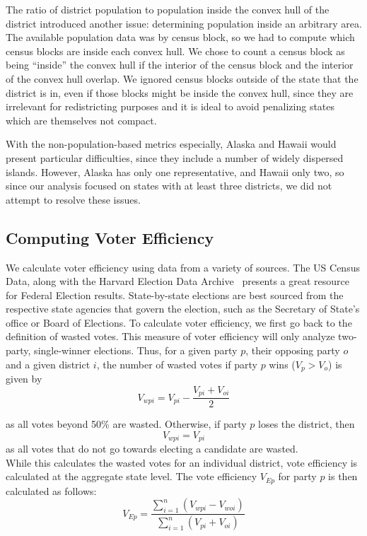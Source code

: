 \documentclass[12pt]{article}
\begin{document}
  The ratio of district population to population inside the convex hull of the district introduced another issue: determining population inside an arbitrary area. The available population data was by census block, so we had to compute which census blocks are inside each convex hull. We chose to count a census block as being ``inside'' the convex hull if the interior of the census block and the interior of the convex hull overlap. We ignored census blocks outside of the state that the district is in, even if those blocks might be inside the convex hull, since they are irrelevant for redistricting purposes and it is ideal to avoid penalizing states which are themselves not compact.


  With the non-population-based metrics especially, Alaska and Hawaii would present particular difficulties, since they include a number of widely dispersed islands.  However, Alaska has only one representative, and Hawaii only two, so since our analysis focused on states with at least three districts, we did not attempt to resolve these issues.

  \subsection {Computing Voter Efficiency}
  We calculate voter efficiency using data from a variety of sources.  The US Census Data, along with the Harvard Election Data Archive~\cite{heda} presents a great resource for Federal Election results.  State-by-state elections are best sourced from the respective state agencies that govern the election, such as the Secretary of State's office or Board of Elections.  To calculate voter efficiency, we first go back to the definition of wasted votes.  This measure of voter efficiency will only analyze two-party, single-winner elections.  Thus, for a given party $p$, their opposing party $o$ and a given district $i$, the number of wasted votes  if party $p$ wins ($V_{p} > V_{o}$)  is given by 
    \[ V_{wpi} = V_{pi} - \frac{V_{pi}+V_{oi}}{2}\]
    
    as all votes beyond 50\% are wasted. Otherwise, if party $p$ loses the district, then
    \[V_{wpi} = V_{pi}\]
    as all votes that do not go towards electing a candidate are wasted.\\
    
    While this calculates the wasted votes for an individual district, vote efficiency is calculated at the aggregate state level.  The vote efficiency $V_{Ep}$ for party $p$ is then calculated as follows:
     \[V_{Ep} = \frac{\sum_{i=1}^{n}(V_{wpi}-V_{woi})}{\sum_{i=1}^{n}(V_{pi}+V_{oi})}\]
     
\end{document}
